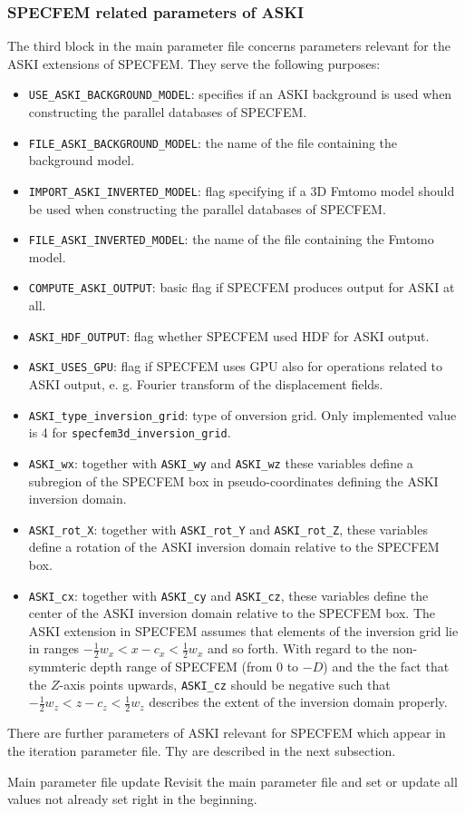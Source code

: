 \subsubsection{SPECFEM related parameters of ASKI}
%
The third block in the main parameter file concerns parameters relevant for the ASKI extensions of SPECFEM. They serve the following purposes:
\begin{itemize}
	\setlength{\itemsep}{-0.1cm}
   \item \verb+USE_ASKI_BACKGROUND_MODEL+: specifies if an ASKI background is used when constructing the parallel databases of SPECFEM.
   \item \verb+FILE_ASKI_BACKGROUND_MODEL+: the name of the file containing the background model.
   \item \verb+IMPORT_ASKI_INVERTED_MODEL+: flag specifying if a 3D Fmtomo model should be used when constructing the parallel databases of SPECFEM.
   \item \verb+FILE_ASKI_INVERTED_MODEL+: the name of the file containing the Fmtomo model.
   \item \verb+COMPUTE_ASKI_OUTPUT+: basic flag if SPECFEM produces output for ASKI at all.
   \item \verb+ASKI_HDF_OUTPUT+: flag whether SPECFEM used HDF for ASKI output.
   \item \verb+ASKI_USES_GPU+: flag if SPECFEM uses GPU also for operations related to ASKI output, e. g. Fourier transform of the displacement fields.
   \item \verb+ASKI_type_inversion_grid+: type of onversion grid. Only implemented value is 4 for \verb+specfem3d_inversion_grid+.
   \item \verb+ASKI_wx+: together with \verb+ASKI_wy+ and \verb+ASKI_wz+ these variables define a subregion of the SPECFEM box in pseudo-coordinates defining the ASKI inversion domain.
   \item \verb+ASKI_rot_X+: together with \verb+ASKI_rot_Y+ and \verb+ASKI_rot_Z+, these variables define a rotation of the ASKI inversion domain relative to the SPECFEM box.
   \item \verb+ASKI_cx+: together with \verb+ASKI_cy+ and \verb+ASKI_cz+, these variables define the center of the ASKI inversion domain relative to the SPECFEM box. The ASKI extension in SPECFEM assumes that elements of the inversion grid lie in ranges $-\frac{1}{2}w_x < x-c_x < \frac{1}{2}w_x$ and so forth. With regard to the non-symmteric depth range of SPECFEM (from $0$ to $-D$) and the the fact that the $Z$-axis points upwards, \verb+ASKI_cz+ should be negative such that $-\frac{1}{2}w_z < z-c_z < \frac{1}{2}w_z$ describes the extent of the inversion domain properly.
\end{itemize}
There are further parameters of ASKI relevant for SPECFEM which appear in the iteration parameter file. Thy are described in the next subsection.
%
 \begin{actionbox}[label={action:update-main-parfile},float=h!]{Main parameter file update}
    Revisit the main parameter file and set or update all values not already set right in the beginning.
 \end{actionbox}
%
